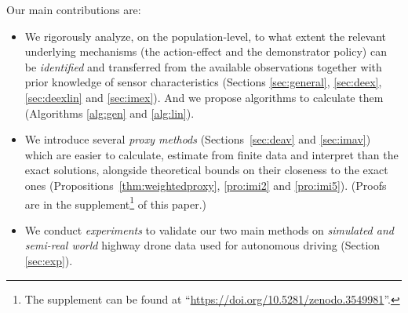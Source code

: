 \documentclass[letterpaper]{article} %
\theoremstyle{definition}%
\theoremstyle{definition}
\begin{document}
Our main contributions are: %
\begin{itemize}

\item We rigorously analyze, on the population-level, %
to what extent the relevant underlying mechanisms (the action-effect and the demonstrator policy) can be \emph{identified} and transferred from the available observations together with prior knowledge of sensor characteristics (Sections \ref{sec:general}, \ref{sec:deex}, \ref{sec:deexlin} and \ref{sec:imex}). And we propose algorithms to calculate them (Algorithms \ref{alg:gen} and \ref{alg:lin}). %


\item We introduce several \emph{proxy methods} (Sections~\ref{sec:deav} and \ref{sec:imav}) which are easier to calculate, estimate from finite data and interpret than the exact solutions, alongside theoretical bounds on their closeness to the exact ones %
(Propositions~\ref{thm:weightedproxy}, \ref{pro:imi2} and \ref{pro:imi5}). (Proofs are in the supplement\footnote{The supplement can be found at ``\url{https://doi.org/10.5281/zenodo.3549981}''.} of this paper.) %
\item We conduct \emph{experiments} to validate our two main methods on \emph{simulated and semi-real world} highway drone data used for autonomous driving (Section \ref{sec:exp}).

\end{itemize}
\end{document}
